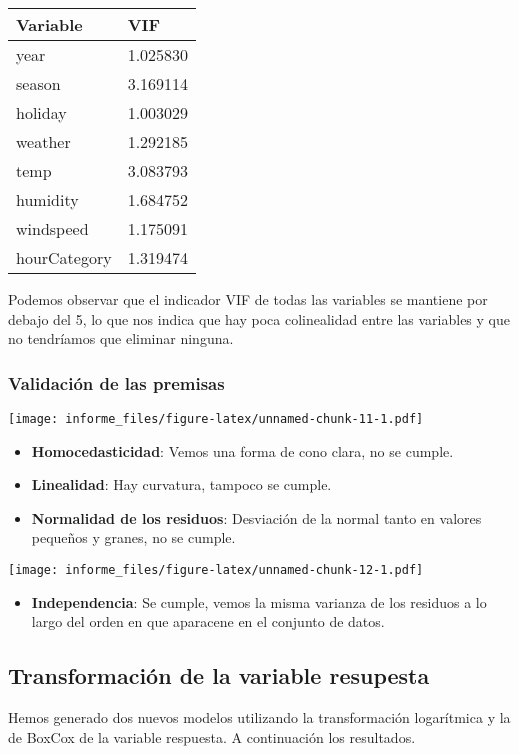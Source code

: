 \documentclass[
]{article}
\providecommand{\tightlist}{%
  \setlength{\itemsep}{0pt}\setlength{\parskip}{0pt}}
\begin{document}
\begin{longtable}[]{@{}ll@{}}
\toprule
Variable & VIF\tabularnewline
\midrule
\endhead
year & 1.025830\tabularnewline
season & 3.169114\tabularnewline
holiday & 1.003029\tabularnewline
weather & 1.292185\tabularnewline
temp & 3.083793\tabularnewline
humidity & 1.684752\tabularnewline
windspeed & 1.175091\tabularnewline
hourCategory & 1.319474\tabularnewline
\bottomrule
\end{longtable}

Podemos observar que el indicador VIF de todas las variables se mantiene
por debajo del 5, lo que nos indica que hay poca colinealidad entre las
variables y que no tendríamos que eliminar ninguna.

\hypertarget{validaciuxf3n-de-las-premisas}{%
\subsubsection{Validación de las
premisas}\label{validaciuxf3n-de-las-premisas}}

\texttt{[image: informe\_files/figure-latex/unnamed-chunk-11-1.pdf]}

\begin{itemize}
\tightlist
\item
  \textbf{Homocedasticidad}: Vemos una forma de cono clara, no se
  cumple.
\item
  \textbf{Linealidad}: Hay curvatura, tampoco se cumple.
\item
  \textbf{Normalidad de los residuos}: Desviación de la normal tanto en
  valores pequeños y granes, no se cumple.
\end{itemize}

\texttt{[image: informe\_files/figure-latex/unnamed-chunk-12-1.pdf]}

\begin{itemize}
\tightlist
\item
  \textbf{Independencia}: Se cumple, vemos la misma varianza de los
  residuos a lo largo del orden en que aparacene en el conjunto de
  datos.
\end{itemize}

\hypertarget{transformaciuxf3n-de-la-variable-resupesta}{%
\subsection{Transformación de la variable
resupesta}\label{transformaciuxf3n-de-la-variable-resupesta}}

Hemos generado dos nuevos modelos utilizando la transformación
logarítmica y la de BoxCox de la variable respuesta. A continuación los
resultados.
\end{document}
